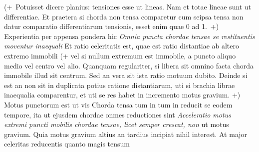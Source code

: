 (+~Potuisset dicere planius: tensiones esse ut lineas. Nam et totae lineae sunt ut differentiae.
Et praetera si chorda non tensa comparetur cum seipsa tensa non datur comparatio differentiarum tensionis, esset enim quae 0 ad 1.~+) Experientia per appensa pondera hic 
\pend 
\pstart {}
\textit{Omnia puncta chordae tensae\protect{} se restituentis moventur inaequali}  Et ratio celeritatis est, quae est ratio distantiae ab altero extremo immobili (+ vel si nullum extremum est immobile, a puncto aliquo medio vel centro vel alio. Quanquam regulariter, si libera sit omnino facta chorda immobile illud sit centrum. Sed an vera sit ista ratio motuum dubito. Deinde si est an non sit in duplicata potius ratione distantiarum, uti si brachia librae inaequalia comparentur, et uti se res habet in incremento motus gravium. +)
\pend 
\pstart {} Motus punctorum\protect{} est ut vis\protect{} 
\pend 
\pstart {} Chorda \textit{}
tensa tum in \textit{} tum in \textit{} reducit se eodem tempore, ita ut ejusdem chordae onmes reductiones sint 
\pend 
\pstart {}
\textit{Acceleratio\protect{} motus extremi puncti mobilis chordae tensae, licet semper crescat, non}  ut motus gravium\protect{}. Quia motus gravium altius an tardius incipiat nihil interest. At major celeritas reducentis quanto magis tensum 
